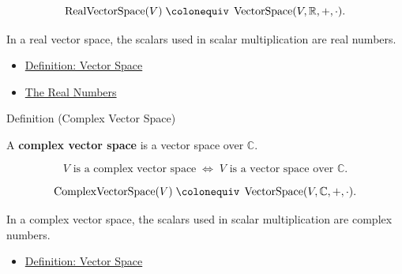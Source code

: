 \begin{remark*}
\[
\operatorname{RealVectorSpace}(V)
\;\colonequiv\;
\operatorname{VectorSpace}(V,\mathbb{R},+,\cdot).
\]
\end{remark*}

\begin{remark*}[Interpretation]
In a real vector space, the scalars used in scalar multiplication are real numbers.
\end{remark*}

\begin{dependencies}
\begin{itemize}
  \item \hyperref[def:vector-space]{Definition: Vector Space}
  \item \hyperref[def:reals]{The Real Numbers}
\end{itemize}
\end{dependencies}


\begin{definitionbox}{Definition (Complex Vector Space)}
\begin{definition}
\label{def:complex-vector-space}
A \textbf{complex vector space} is a vector space over $\mathbb{C}$.
\end{definition}
\end{definitionbox}

\begin{remark*}
\[
V \text{ is a complex vector space}
\;\Longleftrightarrow\;
V \text{ is a vector space over } \mathbb{C}.
\]
\end{remark*}

\begin{remark*}
\[
\operatorname{ComplexVectorSpace}(V)
\;\colonequiv\;
\operatorname{VectorSpace}(V,\mathbb{C},+,\cdot).
\]
\end{remark*}

\begin{remark*}[Interpretation]
In a complex vector space, the scalars used in scalar multiplication are complex numbers.
\end{remark*}

\begin{dependencies}
\begin{itemize}
  \item \hyperref[def:vector-space]{Definition: Vector Space}
\end{itemize}
\end{dependencies}

